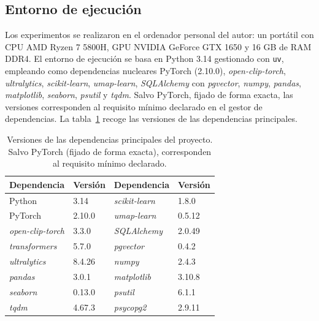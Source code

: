 \subsection{Entorno de ejecución}
\label{subsec:entorno}
Los experimentos se realizaron en el ordenador personal del autor: un portátil
con CPU AMD Ryzen 7 5800H, GPU NVIDIA GeForce GTX 1650 y 16 GB de RAM DDR4. El
entorno de ejecución se basa en Python 3.14 gestionado con \texttt{uv},
empleando como dependencias nucleares PyTorch (2.10.0),
\textit{open-clip-torch}, \textit{ultralytics}, \textit{scikit-learn},
\textit{umap-learn}, \textit{SQLAlchemy} con \textit{pgvector}, \textit{numpy},
\textit{pandas}, \textit{matplotlib}, \textit{seaborn}, \textit{psutil} y
\textit{tqdm}. Salvo PyTorch, fijado de forma exacta, las versiones
corresponden al requisito mínimo declarado en el gestor de dependencias. La
tabla~\ref{tab:dependencias} recoge las versiones de las dependencias
principales.

\begin{table}[h!]
  \centering
  \begin{tabular}{|l|l||l|l|} \hline
    \textbf{Dependencia} & \textbf{Versión} & \textbf{Dependencia} & \textbf{Versión} \\ \hline
    Python           & 3.14    & \textit{scikit-learn} & 1.8.0   \\ \hline
    PyTorch          & 2.10.0  & \textit{umap-learn}   & 0.5.12  \\ \hline
    \textit{open-clip-torch} & 3.3.0 & \textit{SQLAlchemy} & 2.0.49 \\ \hline
    \textit{transformers}    & 5.7.0 & \textit{pgvector}   & 0.4.2  \\ \hline
    \textit{ultralytics}     & 8.4.26 & \textit{numpy}     & 2.4.3  \\ \hline
    \textit{pandas}  & 3.0.1   & \textit{matplotlib}   & 3.10.8 \\ \hline
    \textit{seaborn} & 0.13.0  & \textit{psutil}       & 6.1.1  \\ \hline
    \textit{tqdm}    & 4.67.3  & \textit{psycopg2}     & 2.9.11 \\ \hline
  \end{tabular}
  \caption[Versiones de las dependencias principales]{Versiones de las
  dependencias principales del proyecto. Salvo PyTorch (fijado de forma
  exacta), corresponden al requisito mínimo declarado.}
  \label{tab:dependencias}
\end{table}

